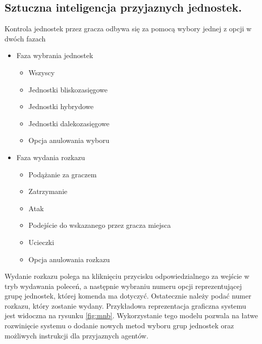 \subsection{Sztuczna inteligencja przyjaznych jednostek.}

Kontrola jednostek przez gracza odbywa się za pomocą wybory jednej z opcji w dwóch fazach
\begin{itemize}
\item Faza wybrania jednostek
  \begin{itemize}
    \item Wszyscy
    \item Jednostki bliskozasięgowe 
    \item Jednostki hybrydowe
    \item Jednostki dalekozasięgowe
    \item Opcja anulowania wyboru
  \end{itemize}

\item Faza wydania rozkazu
  \begin{itemize}
    \item Podążanie za graczem
    \item Zatrzymanie
    \item Atak
    \item Podejście do wskazanego przez gracza miejsca
    \item Ucieczki
      \item Opcja anulowania rozkazu
  \end{itemize}
\end{itemize}
Wydanie rozkazu polega na kliknięciu przycisku odpowiedzialnego za wejście w tryb wydawania poleceń, a następnie
wybraniu numeru opcji reprezentującej grupę jednostek, której komenda ma dotyczyć. Ostatecznie należy podać numer rozkazu, który zostanie wydany.
Przykładowa reprezentacja graficzna systemu jest widoczna na rysunku \ref{fig:mnb}.
Wykorzystanie tego modelu pozwala na łatwe rozwinięcie systemu o dodanie nowych metod wyboru grup jednostek oraz możliwych instrukcji dla przyjaznych agentów.
